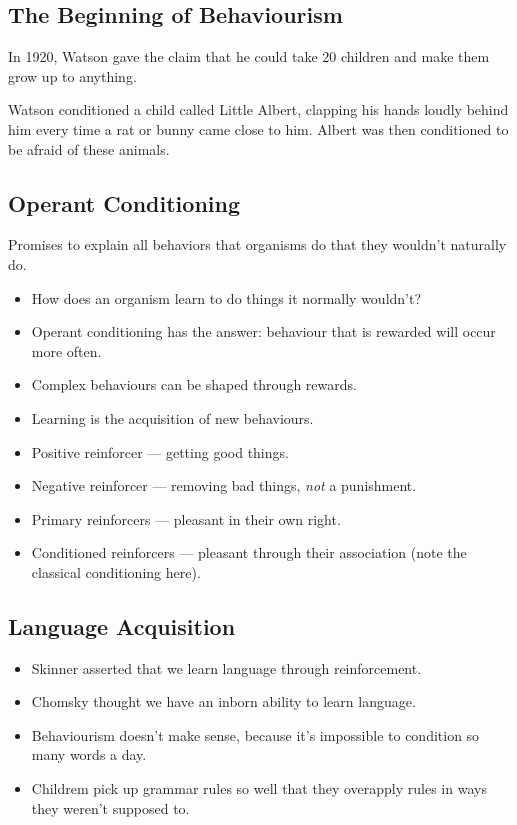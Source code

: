 \documentclass[12pt]{article}
\begin{document}
\subsection{The Beginning of Behaviourism}

In 1920, Watson gave the claim that he could take 20 children and make them grow
up to anything.

Watson conditioned a child called Little Albert, clapping his hands loudly
behind him every time a rat or bunny came close to him. Albert was then
conditioned to be afraid of these animals.

\subsection{Operant Conditioning}

Promises to explain all behaviors that organisms do that they wouldn't naturally
do.

\begin{itemize}
	\item How does an organism learn to do things it normally wouldn't?
	\item Operant conditioning has the answer: behaviour that is rewarded will
		occur more often.
	\item Complex behaviours can be shaped through rewards.
	\item Learning is the acquisition of new behaviours.
	\item Positive reinforcer --- getting good things.
	\item Negative reinforcer --- removing bad things, \emph{not} a punishment.
	\item Primary reinforcers --- pleasant in their own right.
	\item Conditioned reinforcers --- pleasant through their association (note
		the classical conditioning here).
\end{itemize}

\subsection{Language Acquisition}

\begin{itemize}
	\item Skinner asserted that we learn language through reinforcement.
	\item Chomsky thought we have an inborn ability to learn language.
	\item Behaviourism doesn't make sense, because it's impossible to condition
		so many words a day.
	\item Childrem pick up grammar rules so well that they overapply rules in
		ways they weren't supposed to.
\end{itemize}
\end{document}
